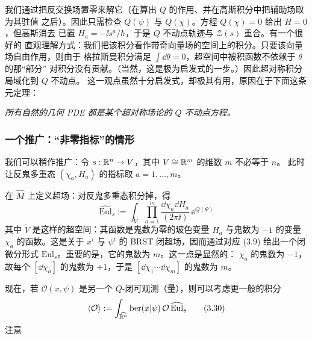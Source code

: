 我们通过把反交换场置零来解它（在算出 $Q$ 的作用、并在高斯积分中把辅助场取为其驻值
之后）。因此只需检查 $Q(\psi)$ 与 $Q(\chi)$。方程 $Q(\chi)=0$ 给出 $H=0$，但高斯消去
已置 $H_a=-\ii s^a/\hbar$，于是 $Q$ 不动点轨迹与 $\mathcal Z(s)$ 重合。有一个很好的
直观理解方式：我们把该积分看作带奇向量场的空间上的积分。只要该向量场自由作用，则由于
格拉斯曼积分满足 $\int\dd\theta=0$，超空间中被积函数不依赖于 $\theta$ 的那“部分”
对积分没有贡献。（当然，这是极为启发式的一步。）因此超对称积分局域化到 $Q$ 不动点。
这一观点虽然十分启发式，却极其有用，原因在于下面这条元定理：

\noindent\emph{所有自然的几何 PDE 都是某个超对称场论的 $Q$ 不动点方程。}

\subsubsection{一个推广：“非零指标”的情形}

我们可以稍作推广：令 $s:\mathbb{R}^n\to V$，其中 $V\cong\mathbb{R}^m$ 的维数 $m$ 不必等于 $n$。
此时让反鬼多重态 $(\chi_a,H_a)$ 的指标取 $a=1,\dots,m$。

在 $\widehat M$ 上定义超场：对反鬼多重态积分掉，得
\begin{equation}
\widehat{\mathrm{Eul}}_s := \int_{\widetilde V}\prod_{a=1}^{m}
\frac{\dd\chi_a\dd H_a}{(2\pi\ii)}\,\ee^{Q(\Psi)}
\tag{3.29}
\end{equation}
其中 $\widetilde V$ 是这样的超空间：其函数是鬼数为零的玻色变量 $H_a$ 与鬼数为 $-1$
的变量 $\chi_a$ 的函数。这是关于 $x^i$ 与 $\psi^i$ 的 BRST 闭超场，因而通过对应
(3.9) 给出一个闭微分形式 $\mathrm{Eul}_s$。重要的是，它的鬼数为 $m$。这一点是显然的：
$\chi_a$ 的鬼数为 $-1$，故每个 $[\dd\chi_a]$ 的鬼数为 $+1$，于是
$[\dd\chi_1\cdots\dd\chi_m]$ 的鬼数为 $m$。

现在，若 $\mathcal O(x,\psi)$ 是另一个 $Q$-闭可观测（量），则可以考虑更一般的积分
\begin{equation}
\langle\mathcal O\rangle := \int_{\widehat{\mathbb{R}^n}}\mathrm{ber}(x|\psi)\,
\mathcal O\,\widehat{\mathrm{Eul}}_s
\tag{3.30}
\end{equation}
注意

